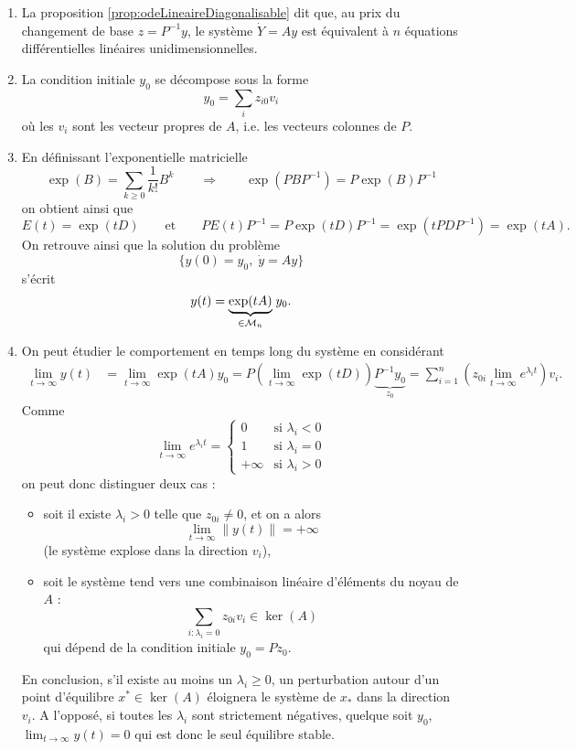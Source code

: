 \remarks
\begin{enumerate}
  \item La proposition \ref{prop:odeLineaireDiagonalisable} dit que, au prix du changement de base $z = P^{-1} y$, le système $\dot Y = A y$ est équivalent à $n$ équations différentielles linéaires unidimensionnelles.
  \item La condition initiale $y_0$ se décompose sous la forme
  $$
  y_0 = \sum_i z_{i0} v_i
  $$
  où les $v_i$ sont les vecteur propres de $A$, i.e. les vecteurs colonnes de $P$.
  \item En définissant l'exponentielle matricielle
  $$
  \exp(B) = \sum_{k \geq 0} \frac1{k!} B^k
  \qquad \Rightarrow \qquad
  \exp(P B P^{-1}) = P \exp(B) P^{-1}
  $$
  on obtient ainsi que
  $$
  E(t) = \exp(t D) 
  \qquad \text{et} \qquad 
  P E(t) P^{-1} = P \exp(t D) P^{-1} = \exp(t P D P^{-1}) = \exp(t A).
  $$
  On retrouve ainsi que la solution du problème
  $$
  \{y(0) = y_0, \; \dot y = A y\}
  $$
  s'écrit
  $$
  y(t) = \underset{\in \mathcal{M}_n}{\underbrace{\exp(t A)}} \; y_0.
  $$
  \item On peut étudier le comportement en temps long du système en considérant
  \begin{align*}
    \lim_{t \rightarrow \infty} y(t)
    & = \lim_{t \rightarrow \infty} \exp(t A) y_0 
    = P \left(\lim_{t \rightarrow \infty} \exp(t D)\right) \underset{z_0}{\underbrace{P^{-1} y_0}}
    = \sum_{i=1}^n \left(z_{0i} \lim_{t \rightarrow \infty} e^{\lambda_i t}\right) v_i.
  \end{align*}
  Comme
  $$
  \lim_{t \rightarrow \infty} e^{\lambda_i t} = 
  \left\{\begin{array}{rr}
          0 & \text{si } \lambda_i < 0 \\
          1 & \text{si } \lambda_i = 0 \\
          +\infty & \text{si } \lambda_i > 0
         \end{array}\right.
  $$
  on peut donc distinguer deux cas : 
  \begin{itemize}
  \item soit il existe $\lambda_i > 0$ telle que $z_{0i} \neq 0$, et on a alors
  $$
  \lim_{t \rightarrow \infty} \|y(t)\| = + \infty
  $$
  (le système explose dans la direction $v_i$), 
  \item soit le système tend vers une combinaison linéaire d'éléments du noyau de $A$ :
  $$
  \sum_{i : \lambda_i = 0} z_{0i} v_i \in \ker(A)
  $$
  qui dépend de la condition initiale $y_0 = P z_0$.
  \end{itemize}
  En conclusion, s'il existe au moins un $\lambda_i \geq 0$, un perturbation autour d'un point d'équilibre $x^* \in \ker(A)$ éloignera le système de $x_ *$ dans la direction $v_i$. A l'opposé, si toutes les $\lambda_i$ sont strictement négatives, quelque soit $y_0$, $\lim_{t \rightarrow \infty} y(t) = 0$ qui est donc le seul équilibre stable.
\end{enumerate}

